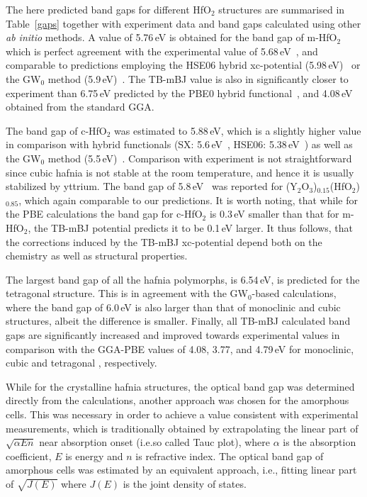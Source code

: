 \documentclass[10pt,a4paper,twocolumn]{article}
\begin{document}
The here predicted band gaps for different HfO$_2$ structures are summarised in Table~\ref{gaps} together with experiment data and band gaps calculated using other \textit{ab initio} methods.
A value of 5.76\,eV is obtained for the band gap of m-HfO$_2$ which is perfect agreement with the experimental value of 5.68\,eV~\cite{Balog1977}, and comparable to predictions employing the HSE06 hybrid xc-potential (5.98\,eV)~\cite{Komsa2010} or the GW$_0$ method (5.9\,eV)~\cite{Gruning2010}.
The TB-mBJ value is also in significantly closer to experiment than 6.75\,eV predicted by the PBE0 hybrid functional~\cite{Komsa2010}, and 4.08\,eV obtained from the standard GGA.

The band gap of c-HfO$_2$ was estimated to 5.88\,eV, which is a slightly higher value in comparison with hybrid functionals (SX: 5.6\,eV~\cite{Clark2010}, HSE06: 5.38\,eV~\cite{Yang2014}) as well as the GW$_0$ method (5.5\,eV)~\cite{Gruning2010}.
Comparison with experiment is not straightforward since cubic hafnia is not stable at the room temperature, and hence it is usually stabilized by yttrium.
The band gap of 5.8\,eV~\cite{Lim2002} was reported for (Y$_2$O$_3$)$_{0.15}$(HfO$_2$)$_{0.85}$, which again comparable to our predictions.
It is worth noting, that while for the PBE calculations the band gap for c-HfO$_2$ is 0.3\,eV smaller than that for m-HfO$_2$, the TB-mBJ potential predicts it to be 0.1\,eV larger. 
It thus follows, that the corrections induced by the TB-mBJ xc-potential depend both on the chemistry as well as structural properties.

The largest band gap of all the hafnia polymorphs, is 6.54\,eV, is predicted for the tetragonal structure. 
This is in agreement with the GW$_0$-based calculations, where the band gap of 6.0\,eV is also larger than that of monoclinic and cubic structures, albeit the difference is smaller.
Finally, all TB-mBJ calculated band gaps are significantly increased and improved towards experimental values in comparison with the GGA-PBE values of 4.08, 3.77, and 4.79\,eV for monoclinic, cubic and tetragonal , respectively.

While for the crystalline hafnia structures, the optical band gap was determined directly from the calculations, another approach was chosen for the amorphous cells.
This was necessary in order to achieve a value consistent with experimental measurements, which is traditionally obtained by extrapolating the linear part of $\sqrt{\alpha E n}$ near absorption onset (i.e.so called Tauc plot), where $\alpha$ is the absorption coefficient, $E$ is energy and $n$ is refractive index. %
The optical band gap of amorphous cells was estimated by an equivalent approach, i.e., fitting linear part of $\sqrt{J(E)}$ where $J(E)$ is the joint density of states. %
\end{document}
